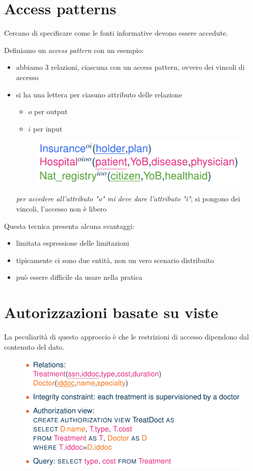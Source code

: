 \documentclass{report}
\begin{document}
\section{Access patterns}
Cercano di specificare come le fonti informative devono essere accedute.

\noindent Definiamo un \textit{access pattern} con un esempio:
\begin{itemize}
    \item abbiamo 3 relazioni, ciascuna con un access pattern, ovvero dei vincoli di accesso
    \item si ha una lettera per ciasuno attributo delle relazione
    \begin{itemize}
        \item $o$ per output 
        \item $i$ per input 
    \end{itemize}

    \begin{figure}[H]
        \centering
        \includegraphics[width=0.6\linewidth]{images/access-pattern.png}
    \end{figure}

    \noindent \textit{per accedere all'attributo "o" mi deve dare l'attributo "i"}; si pongono dei vincoli, 
    l'accesso non è libero
\end{itemize}

\noindent Questa tecnica presenta alcuna svantaggi:
\begin{itemize}
    \item limitata espressione delle limitazioni 
    \item tipicamente ci sono due entità, non un vero scenario distribuito 
    \item può essere difficile da usare nella pratica 
\end{itemize}

\section{Autorizzazioni basate su viste}
La peculiarità di questo approccio è che le restrizioni di accesso dipendono dal contenuto del dato.

\begin{figure}[H]
    \centering
    \includegraphics[width=0.8\linewidth]{images/view-auth.png}
\end{figure}
\end{document}
